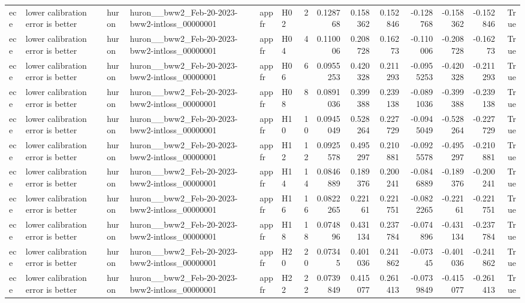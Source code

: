 \begin{longtable}{llllllrrrrrrrr}
ece & lower calibration error is better & huron & huron\_\_bww2\_Feb-20-2023-bww2-intloss\_00000001 & appfr & H02 & 2 & 0.128768 & 0.158362 & 0.152846 & -0.128768 & -0.158362 & -0.152846 & True \\
ece & lower calibration error is better & huron & huron\_\_bww2\_Feb-20-2023-bww2-intloss\_00000001 & appfr & H04 & 4 & 0.110006 & 0.208728 & 0.16273 & -0.110006 & -0.208728 & -0.16273 & True \\
ece & lower calibration error is better & huron & huron\_\_bww2\_Feb-20-2023-bww2-intloss\_00000001 & appfr & H06 & 6 & 0.0955253 & 0.420328 & 0.211293 & -0.0955253 & -0.420328 & -0.211293 & True \\
ece & lower calibration error is better & huron & huron\_\_bww2\_Feb-20-2023-bww2-intloss\_00000001 & appfr & H08 & 8 & 0.0891036 & 0.399388 & 0.239138 & -0.0891036 & -0.399388 & -0.239138 & True \\
ece & lower calibration error is better & huron & huron\_\_bww2\_Feb-20-2023-bww2-intloss\_00000001 & appfr & H10 & 10 & 0.0945049 & 0.528264 & 0.227729 & -0.0945049 & -0.528264 & -0.227729 & True \\
ece & lower calibration error is better & huron & huron\_\_bww2\_Feb-20-2023-bww2-intloss\_00000001 & appfr & H12 & 12 & 0.0925578 & 0.495297 & 0.210881 & -0.0925578 & -0.495297 & -0.210881 & True \\
ece & lower calibration error is better & huron & huron\_\_bww2\_Feb-20-2023-bww2-intloss\_00000001 & appfr & H14 & 14 & 0.0846889 & 0.189376 & 0.200241 & -0.0846889 & -0.189376 & -0.200241 & True \\
ece & lower calibration error is better & huron & huron\_\_bww2\_Feb-20-2023-bww2-intloss\_00000001 & appfr & H16 & 16 & 0.0822265 & 0.22161 & 0.221751 & -0.0822265 & -0.22161 & -0.221751 & True \\
ece & lower calibration error is better & huron & huron\_\_bww2\_Feb-20-2023-bww2-intloss\_00000001 & appfr & H18 & 18 & 0.074896 & 0.431134 & 0.237784 & -0.074896 & -0.431134 & -0.237784 & True \\
ece & lower calibration error is better & huron & huron\_\_bww2\_Feb-20-2023-bww2-intloss\_00000001 & appfr & H20 & 20 & 0.07345 & 0.401036 & 0.241862 & -0.07345 & -0.401036 & -0.241862 & True \\
ece & lower calibration error is better & huron & huron\_\_bww2\_Feb-20-2023-bww2-intloss\_00000001 & appfr & H22 & 22 & 0.0739849 & 0.415077 & 0.261413 & -0.0739849 & -0.415077 & -0.261413 & True \\

\end{longtable}

